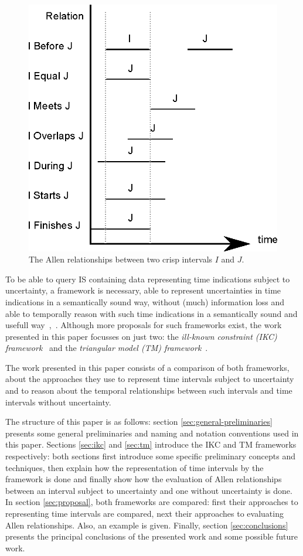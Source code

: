 \begin{figure}[h]
   \centering
   \includegraphics[width=0.9\columnwidth]{graphs/allen.eps}
   \caption{The Allen relationships between two crisp intervals $I$ and $J$.  }
   \label{fig:allen-relationships}
 \end{figure}

To be able to query IS containing data representing time indications subject to uncertainty, a framework is necessary, able to represent uncertainties in time indications in a semantically sound way, without (much) information loss and able to temporally reason with such time indications in a semantically sound and usefull way~\cite{Dubois1983},~\cite{Dubois2003}. Although more proposals for such frameworks exist, the work presented in this paper focusses on just two: the \emph{ill-known constraint \emph{(IKC)} framework}~\cite{Pons2011} and the \emph{triangular model \emph{(TM)} framework}~\cite{DeTre2012}.

The work presented in this paper consists of a comparison of both frameworks, about the approaches they use to represent time intervals subject to uncertainty and to reason about the temporal relationships between such intervals and time intervals without uncertainty.

The structure of this paper is as follows: section \ref{sec:general-preliminaries} presents some general preliminaries and naming and notation conventions used in this paper. Sections \ref{sec:ikc} and \ref{sec:tm} introduce the IKC and TM frameworks respectively: both sections first introduce some specific preliminary concepts and techniques, then explain how the representation of time intervals by the framework is done and finally show how the evaluation of Allen relationships between an interval subject to uncertainty and one without uncertainty is done. In section \ref{sec:proposal}, both frameworks are compared: first their approaches to representing time intervals are compared, next their approaches to evaluating Allen relationships. Also, an example is given. Finally, section \ref{sec:conclusions} presents the principal conclusions of the presented work and some possible future work. 

